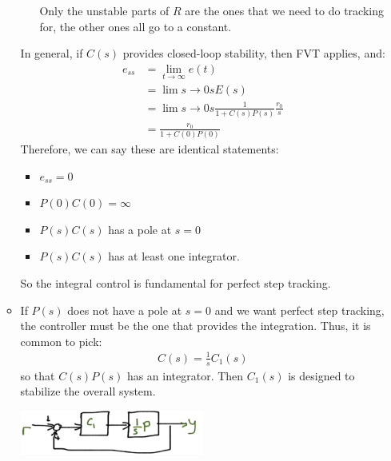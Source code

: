 \begin{enumerate}
\begin{itemize}
\begin{enumerate}
                            Only the unstable parts of $R$ are the ones that we need to do tracking for, the other ones all go to a constant.
                    \end{enumerate}
                    In general, if $C(s)$ provides closed-loop stability, then FVT applies, and:
                    \begin{align*}
                        e_{ss} &= \lim_{t\to \infty} e(t) \\
                        &= \lim{s \to 0} s E(s) \\
                        &= \lim{s \to 0} s \frac{1}{1+ C(s)P(s)} \frac{r_0}{s} \\
                        &= \frac{r_0}{1+ C(0) P(0)}
                    \end{align*}
                    Therefore, we can say these are identical statements:
                    \begin{itemize}
                        \item $e_{ss} = 0$
                        \item $P(0) C(0) = \infty$
                        \item $P(s)C(s)$ has a pole at $s = 0$
                        \item $P(s)C(s)$ has at least one integrator.
                    \end{itemize}
                    So the integral control is fundamental for perfect step tracking.
                \item If $P(s)$ does not have a pole at $s = 0$ and we want perfect step tracking, the controller must be the one that provides the integration. Thus, it is common to pick:
                    \begin{align*}
                        C(s) = \frac{1}{s}C_1(s)
                    \end{align*}
                    so that $C(s)P(s)$ has an integrator. Then $C_1(s)$ is designed to stabilize the overall system.
                    \begin{center}\includegraphics[width=0.5\textwidth,keepaspectratio]{images/5-11-c.png}\end{center}


\end{itemize}
\end{enumerate}
